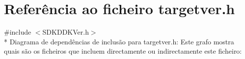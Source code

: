 \hypertarget{a00020}{\section{Referência ao ficheiro targetver.\+h}
\label{a00020}
}
{\ttfamily \#include $<$S\+D\+K\+D\+D\+K\+Ver.\+h$>$}\\*
Diagrama de dependências de inclusão para targetver.\+h\+:
Este grafo mostra quais são os ficheiros que incluem directamente ou indirectamente este ficheiro\+:

